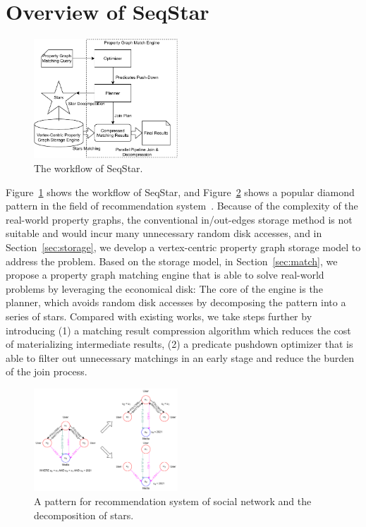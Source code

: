 \section{Overview of SeqStar}\label{sec:framework}
\begin{figure}[ht]
  \centering
  \includegraphics[width=0.48\textwidth]{img/architecture.pdf}
  \caption{The workflow of SeqStar.}\label{img:architecture}
\end{figure}
Figure~\ref{img:architecture} shows the workflow of SeqStar,
and Figure~\ref{img:pattern_graph} shows a popular diamond pattern in the field of recommendation system~\cite{DBLP:journals/pvldb/GuptaSGGZLL14,DBLP:journals/pvldb/SharmaJBLL16}.
Because of the complexity of the real-world property graphs,
the conventional in/out-edges storage method is not suitable and would incur many unnecessary random disk accesses,
and in Section~\ref{sec:storage}, we develop a vertex-centric property graph storage model to address the problem.
Based on the storage model, in Section~\ref{sec:match},
we propose a property graph matching engine that is able to solve real-world problems by leveraging the economical disk:
The core of the engine is the planner, which avoids random disk accesses by decomposing the pattern into a series of stars.
Compared with existing works, we take steps further by introducing
(1) a matching result compression algorithm which reduces the cost of materializing intermediate results,
(2) a predicate pushdown optimizer that is able to filter out unnecessary matchings in an early stage and reduce the burden of the join process.
\begin{figure}[ht]
  \centering
  \includegraphics[width=0.48\textwidth]{img/pattern_graph.pdf}
  \caption{A pattern for recommendation system of social network and the decomposition of stars.}\label{img:pattern_graph}
\end{figure}

